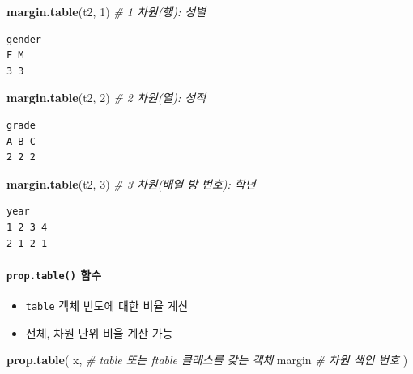 \documentclass[
  11pt,
]{krantz}
\newenvironment{Shaded}{\begin{snugshade}}{\end{snugshade}}
\newcommand{\CommentTok}[1]{\textcolor[rgb]{0.37,0.37,0.37}{\textit{#1}}}
\newcommand{\DecValTok}[1]{\textcolor[rgb]{0.06,0.06,0.06}{#1}}
\newcommand{\KeywordTok}[1]{\textcolor[rgb]{0.27,0.27,0.27}{\textbf{#1}}}
\newcommand{\NormalTok}[1]{#1}
\providecommand{\tightlist}{%
  \setlength{\itemsep}{0pt}\setlength{\parskip}{0pt}}
\begin{document}
\begin{Shaded}
\begin{Highlighting}[]
\KeywordTok{margin.table}\NormalTok{(t2, }\DecValTok{1}\NormalTok{) }\CommentTok{# 1 차원(행): 성별}
\end{Highlighting}
\end{Shaded}

\begin{verbatim}
gender
F M 
3 3 
\end{verbatim}

\begin{Shaded}
\begin{Highlighting}[]
\KeywordTok{margin.table}\NormalTok{(t2, }\DecValTok{2}\NormalTok{) }\CommentTok{# 2 차원(열): 성적}
\end{Highlighting}
\end{Shaded}

\begin{verbatim}
grade
A B C 
2 2 2 
\end{verbatim}

\begin{Shaded}
\begin{Highlighting}[]
\KeywordTok{margin.table}\NormalTok{(t2, }\DecValTok{3}\NormalTok{) }\CommentTok{# 3 차원(배열 방 번호): 학년}
\end{Highlighting}
\end{Shaded}

\begin{verbatim}
year
1 2 3 4 
2 1 2 1 
\end{verbatim}

\normalsize

\hypertarget{table-fun5}{%
\paragraph{\texorpdfstring{\texttt{prop.table()} 함수}{prop.table() 함수}}\label{table-fun5}}

\begin{itemize}
\tightlist
\item
  \texttt{table} 객체 빈도에 대한 비율 계산
\item
  전체, 차원 단위 비율 계산 가능
\end{itemize}

\footnotesize

\begin{Shaded}
\begin{Highlighting}[]
\KeywordTok{prop.table}\NormalTok{(}
\NormalTok{  x,  }\CommentTok{# table 또는 ftable 클래스를 갖는 객체}
\NormalTok{  margin }\CommentTok{# 차원 색인 번호}
\NormalTok{)}
\end{Highlighting}
\end{Shaded}
\end{document}

